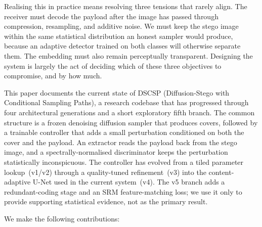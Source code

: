 \documentclass[journal]{IEEEtran}
\begin{document}
Realising this in practice means resolving three tensions that rarely
align. The receiver must decode the payload after the image has
passed through compression, resampling, and additive noise. We must
keep the stego image within the same statistical distribution an
honest sampler would produce, because an adaptive detector trained on
both classes will otherwise separate them. The embedding must also
remain perceptually transparent. Designing the system is largely the
act of deciding which of these three objectives to compromise, and
by how much.

This paper documents the current state of DSCSP (Diffusion-Stego with
Conditional Sampling Paths), a research codebase that has progressed
through four architectural generations and a short exploratory fifth
branch. The common structure is a frozen denoising diffusion sampler
that produces covers, followed by a trainable controller that adds a
small perturbation conditioned on both the cover and the payload. An
extractor reads the payload back from the stego image, and a
spectrally-normalised discriminator keeps the perturbation
statistically inconspicuous. The controller has evolved from a tiled
parameter lookup~(v1/v2) through a quality-tuned refinement~(v3) into
the content-adaptive U-Net used in the current system~(v4). The v5
branch adds a redundant-coding stage and an SRM feature-matching loss;
we use it only to provide supporting statistical evidence, not as the
primary result.

We make the following contributions:
\end{document}

